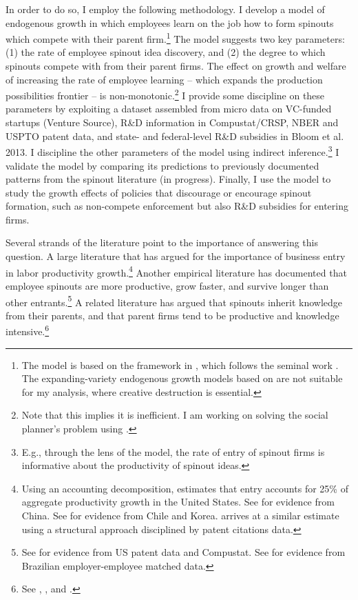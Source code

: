 \documentclass[12pt,english]{article}
\theoremstyle{remark}
\begin{document}
In order to do so, I employ the following methodology. I develop a model of endogenous growth in which employees learn on the job how to form spinouts which compete with their parent firm.\footnote{The model is based on the framework in \cite{akcigit_growth_2018}, which follows the seminal work \cite{grossman_quality_1991}. The expanding-variety endogenous growth models based on \cite{romer_increasing_1986} are not suitable for my analysis, where creative destruction is essential.} The model suggests two key parameters: (1) the rate of employee spinout idea discovery, and (2) the degree to which spinouts compete with from their parent firms. The effect on growth and welfare of increasing the rate of employee learning -- which expands the production possibilities frontier -- is non-monotonic.\footnote{Note that this implies it is inefficient. I am working on solving the social planner's problem using \cite{nuno_social_2018}.} I provide some discipline on these parameters by exploiting a dataset assembled from micro data on VC-funded startups (Venture Source), R\&D information in Compustat/CRSP, NBER and USPTO patent data, and state- and federal-level R\&D subsidies in Bloom et al. 2013. I discipline the other parameters of the model using indirect inference.\footnote{E.g., through the lens of the model, the rate of entry of spinout firms is informative about the productivity of spinout ideas.} I validate the model by comparing its predictions to previously documented patterns from the spinout literature (in progress). Finally, I use the model to study the growth effects of policies that discourage or encourage spinout formation, such as non-compete enforcement but also R\&D subsidies for entering firms.

Several strands of the literature point to the importance of answering this question. A large literature that has argued for the importance of business entry in labor productivity growth.\footnote{Using an accounting decomposition, \cite{foster_aggregate_2001} estimates that entry accounts for 25\% of aggregate productivity growth in the United States. See \cite{brandt_creative_2012} for evidence from China. See \cite{asturias_firm_2019} for evidence from Chile and Korea. \cite{akcigit_growth_2018} arrives at a similar estimate using a structural approach disciplined by patent citations data.} Another empirical literature has documented that employee spinouts are more productive, grow faster, and survive longer than other entrants.\footnote{See \cite{baslandze_spinout_2019} for evidence from US patent data and Compustat. See \cite{muendler_employee_2012} for evidence from Brazilian employer-employee matched data.} A related literature has argued that spinouts inherit knowledge from their parents, and that parent firms tend to be productive and knowledge intensive.\footnote{See \cite{klepper_entry_2005}, \cite{gompers_entrepreneurial_2005}, and \cite{baslandze_spinout_2019}.} 
\end{document}
